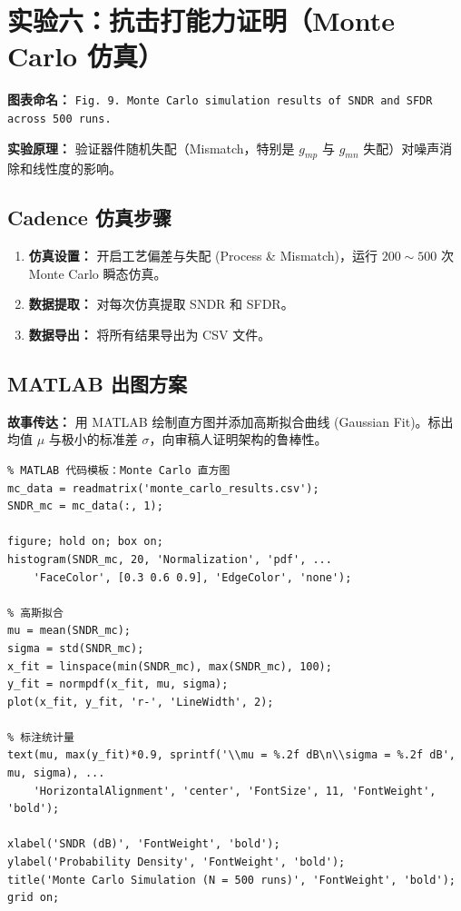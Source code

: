 \documentclass[11pt,a4paper,UTF8]{ctexart}
\begin{document}
\section{实验六：抗击打能力证明（Monte Carlo 仿真）}

\textbf{图表命名：} \texttt{Fig. 9. Monte Carlo simulation results of SNDR and SFDR across 500 runs.}

\textbf{实验原理：} 验证器件随机失配（Mismatch，特别是 $g_{mp}$ 与 $g_{mn}$ 失配）对噪声消除和线性度的影响。

\subsection{Cadence 仿真步骤}

\begin{enumerate}[leftmargin=*]
    \item \textbf{仿真设置：} 开启工艺偏差与失配 (Process \& Mismatch)，运行 $200 \sim 500$ 次 Monte Carlo 瞬态仿真。
    
    \item \textbf{数据提取：} 对每次仿真提取 SNDR 和 SFDR。
    
    \item \textbf{数据导出：} 将所有结果导出为 CSV 文件。
\end{enumerate}

\subsection{MATLAB 出图方案}

\textbf{故事传达：} 用 MATLAB 绘制直方图并添加高斯拟合曲线 (Gaussian Fit)。标出均值 $\mu$ 与极小的标准差 $\sigma$，向审稿人证明架构的鲁棒性。

\begin{lstlisting}
% MATLAB 代码模板：Monte Carlo 直方图
mc_data = readmatrix('monte_carlo_results.csv');
SNDR_mc = mc_data(:, 1);

figure; hold on; box on;
histogram(SNDR_mc, 20, 'Normalization', 'pdf', ...
    'FaceColor', [0.3 0.6 0.9], 'EdgeColor', 'none');

% 高斯拟合
mu = mean(SNDR_mc);
sigma = std(SNDR_mc);
x_fit = linspace(min(SNDR_mc), max(SNDR_mc), 100);
y_fit = normpdf(x_fit, mu, sigma);
plot(x_fit, y_fit, 'r-', 'LineWidth', 2);

% 标注统计量
text(mu, max(y_fit)*0.9, sprintf('\\mu = %.2f dB\n\\sigma = %.2f dB', mu, sigma), ...
    'HorizontalAlignment', 'center', 'FontSize', 11, 'FontWeight', 'bold');

xlabel('SNDR (dB)', 'FontWeight', 'bold');
ylabel('Probability Density', 'FontWeight', 'bold');
title('Monte Carlo Simulation (N = 500 runs)', 'FontWeight', 'bold');
grid on;
\end{lstlisting}
\end{document}
